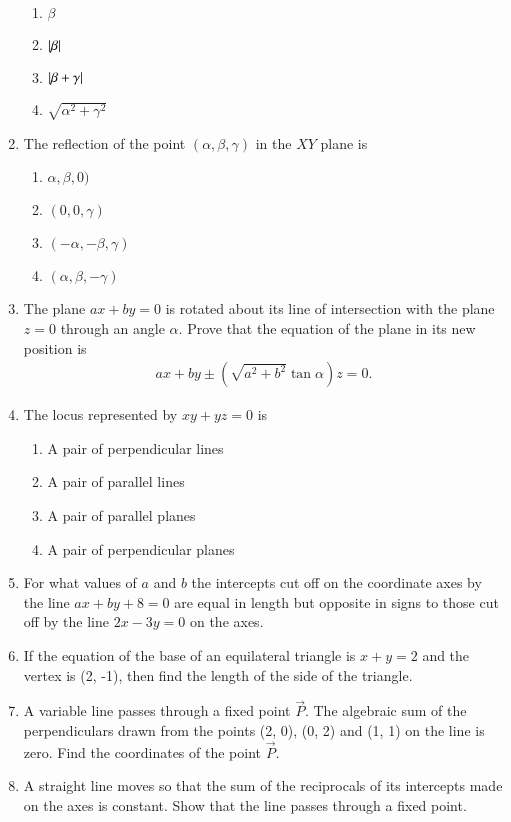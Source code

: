 \begin{enumerate}[label=\thesubsection.\arabic*, ref=\thesubsection.\theenumi]
\begin{enumerate}
	\item $\beta$ 
	\item $\left\vert\beta\right\vert$
	\item $\left\vert\beta+\gamma\right\vert$
	\item $\sqrt{\alpha^2+\gamma^2}$
\end{enumerate}
\item The reflection of the point $(\alpha,  \beta,  \gamma )$ in the $XY$ plane is 
\begin{enumerate}
	\item $\alpha, \beta, 0)$
	\item $(0, 0, \gamma)$
	\item $(-\alpha, -\beta, \gamma)$
	\item $(\alpha, \beta, -\gamma)$
\end{enumerate}
\item The plane $ax+by=0$ is rotated about its line of intersection with the plane $z=0$ through an angle $\alpha.$ Prove that the equation of the plane in its new position is 
\begin{align*}
	ax+by \pm (\sqrt{a^2+b^2} \tan\alpha)z=0.
\end{align*}
\item The locus represented by $xy+yz=0$ is 
\begin{enumerate}
	\item A pair of perpendicular lines
	\item A pair of parallel lines
	\item A pair of parallel planes 
	\item A pair of perpendicular planes
\end{enumerate}
\item For what values of $a$ and $b$ the intercepts cut off on the coordinate axes by the line $ax+by+8=0$ are equal in length but opposite in signs to those cut off by the line $2x-3y=0$ on the axes.
\item If the equation of the base of an equilateral triangle is $x+y=2$ and the vertex is (2, -1),  then find the length of the side of the triangle. 
\item A variable line passes through a fixed point $\vec{P}$. The algebraic sum of the perpendiculars drawn from the points (2, 0),  (0, 2) and (1, 1) on the line is zero. Find the coordinates of the point $\vec{P}$.  
\item A straight line moves so that the sum of the reciprocals of its intercepts made on the axes is constant. Show that the line passes through a fixed point. 

\end{enumerate}
